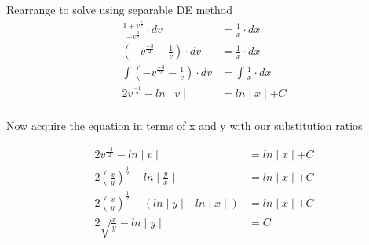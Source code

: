 \documentclass{article}
\begin{document}
\begin{flushleft}
{Rearrange to solve using separable DE method\\
\begin{align*}
\frac{1 + v^\frac{1}{2}}{-v^\frac{3}{2}} \cdot dv & = \frac{1}{x} \cdot dx \\
(-v^\frac{-3}{2} - \frac{1}{v}) \cdot dv & = \frac{1}{x} \cdot dx \\
\int (-v^\frac{-3}{2} - \frac{1}{v}) \cdot dv & = \int \frac{1}{x} \cdot dx  \\
2v^\frac{-1}{2} - ln \mid v \mid & = ln \mid x \mid + C \\
\end{align*}

Now acquire the equation in terms of x and y with our substitution ratios

\begin{align*}
2v^\frac{-1}{2} - ln \mid v \mid & = ln \mid x \mid + C \\
2(\frac{x}{y})^\frac{1}{2} - ln \mid \frac{y}{x} \mid & = ln \mid x \mid + C \\
2(\frac{x}{y})^\frac{1}{2} - (ln \mid y \mid - ln \mid x \mid) & = ln \mid x \mid + C \\
2\sqrt{\frac{x}{y}} - ln \mid y \mid & = C \\
\end{align*}

}


\end{flushleft}
\end{document}
